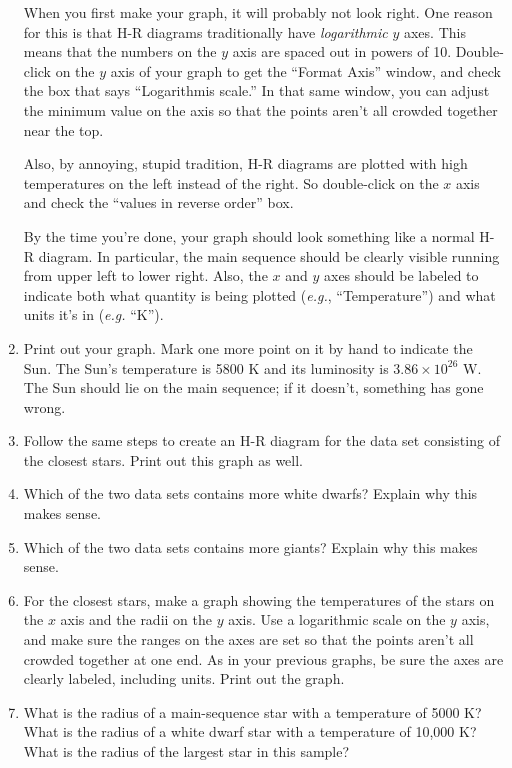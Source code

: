 \begin{enumerate}
When you first make your graph,
it will probably not look right.  One reason for this is that H-R diagrams
traditionally have {\it logarithmic} $y$ axes.  This means that
the numbers on the $y$ axis are spaced out in powers of 10.  
Double-click on the $y$ axis of your graph to get the ``Format Axis''
window, and check the box that says ``Logarithmis scale.''
In
that same window, you can
adjust the minimum value on the axis so that the points aren't all
crowded together near the top.

Also, by annoying, stupid tradition, H-R diagrams are plotted with
high temperatures on the left instead of the right.  So double-click
on the $x$ axis and check the ``values in reverse order'' box.

By the time you're done, your graph should look something like a
normal H-R diagram.  In particular, the main sequence should be clearly
visible running from upper left to lower right.  Also, the $x$ and $y$ 
axes should be labeled to indicate both what quantity
is being plotted ({\it e.g.}, ``Temperature'') and what units it's
in ({\it e.g.} ``K'').

\item Print out your graph.  Mark one more point on it by hand
to indicate the Sun.  The Sun's temperature is 5800 K and its
luminosity is $3.86\times 10^{26}$ W.  The Sun should lie
on the main sequence; if it doesn't, something has gone wrong.

\item Follow the same steps to create an H-R diagram for the data
set consisting of the closest stars.  Print out this graph as well.

\item Which of the two data sets contains more white dwarfs?
Explain why this makes sense.

\answerspace{1in}

\item Which of the two data sets contains more giants?  Explain why
this makes sense.

\answerspace{1in}

\item For the
closest stars, make a graph showing the temperatures of the stars on the $x$
axis and the radii on the $y$ axis.  Use a logarithmic scale on the
$y$ axis, and make sure the ranges on the axes are set so that the points
aren't all crowded together at one end.  As in your previous graphs,
be sure the axes are clearly labeled, including units.
Print out the graph.

\item What is the radius of a main-sequence star with a temperature of 5000 K?
What is the radius of a white dwarf star with a temperature of 10,000 K?
What is the radius of the largest star in this sample?

\answerspace{1in}


\end{enumerate}





